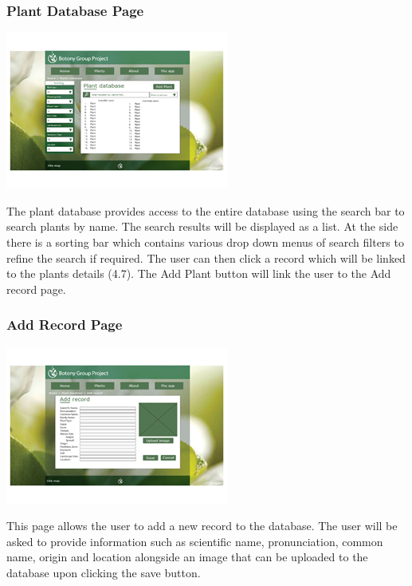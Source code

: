 		\subsubsection{Plant Database Page}
			\begin{center}
				\includegraphics[scale=1]{uiDesign/botanyWebPlantDatabase.png}
			\end{center}
		The plant database provides access to the entire database using the search bar to search plants by name. The search results will be displayed as a list. At the side there is a sorting bar which contains various drop down menus of search filters to refine the search if required. The user can then click a record which will be linked to the plants details (4.7). The Add Plant button will link the user to the Add record page.

		\subsubsection{Add Record Page}
			\begin{center}
				\includegraphics[scale=1]{uiDesign/botanyWebAddRecord.png}
			\end{center}
		This page allows the user to add a new record to the database. The user will be asked to provide information such as scientific name, pronunciation, common name, origin and location alongside an image that can be uploaded to the database upon clicking the save button. 
		
